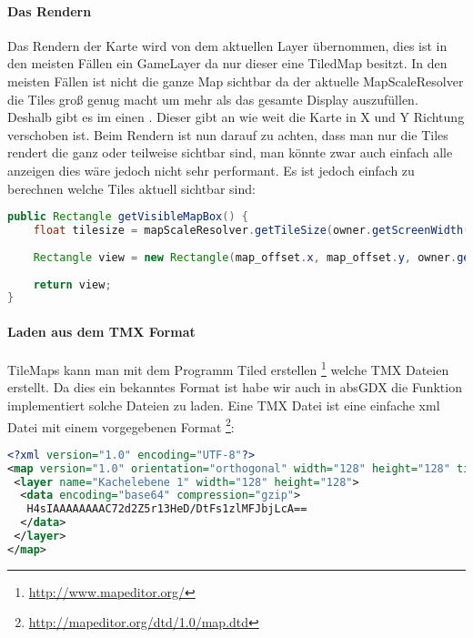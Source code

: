
\paragraph{Das Rendern}

Das Rendern der Karte wird von dem aktuellen Layer übernommen, dies ist in den meisten Fällen ein GameLayer da nur dieser eine TiledMap besitzt.
In den meisten Fällen ist nicht die ganze Map sichtbar da der aktuelle MapScaleResolver die Tiles groß genug macht um mehr als das gesamte Display auszufüllen. Deshalb gibt es im  einen . Dieser gibt an wie weit die Karte in X und Y Richtung verschoben ist.
Beim Rendern ist nun darauf zu achten, dass man nur die Tiles rendert die ganz oder teilweise sichtbar sind, man könnte zwar auch einfach alle anzeigen dies wäre jedoch nicht sehr performant. Es ist jedoch einfach zu berechnen welche Tiles aktuell sichtbar sind:\cite[S 232f.]{DGIJ}

\doinline
\begin{lstlisting}[caption=Ermitteln der aktuell sichtbare Tiles, title=\hspace{0 pt}, language=java]
public Rectangle getVisibleMapBox() {
	float tilesize = mapScaleResolver.getTileSize(owner.getScreenWidth(), owner.getScreenHeight(), map.height, map.width);
	
	Rectangle view = new Rectangle(map_offset.x, map_offset.y, owner.getScreenWidth() / tilesize, owner.getScreenHeight() / tilesize);
	
	return view;
}
\end{lstlisting}

\paragraph{Laden aus dem TMX Format}

TileMaps kann man mit dem Programm Tiled erstellen \footnote{\url{http://www.mapeditor.org/}} welche TMX Dateien erstellt. Da dies ein bekanntes Format ist habe wir auch in absGDX die Funktion implementiert solche Dateien zu laden. Eine TMX Datei ist eine einfache xml Datei mit einem vorgegebenen Format \footnote{\url{http://mapeditor.org/dtd/1.0/map.dtd}}:

\doinline
\begin{lstlisting}[caption=Beipiel einer TMX Datei, title=\hspace{0 pt}, language=xml]
<?xml version="1.0" encoding="UTF-8"?>
<map version="1.0" orientation="orthogonal" width="128" height="128" tilewidth="16" tileheight="16">
 <layer name="Kachelebene 1" width="128" height="128">
  <data encoding="base64" compression="gzip">
   H4sIAAAAAAAAC72d2Z5r13HeD/DtFs1zlMFJbjLcA==
  </data>
 </layer>
</map>
\end{lstlisting}

